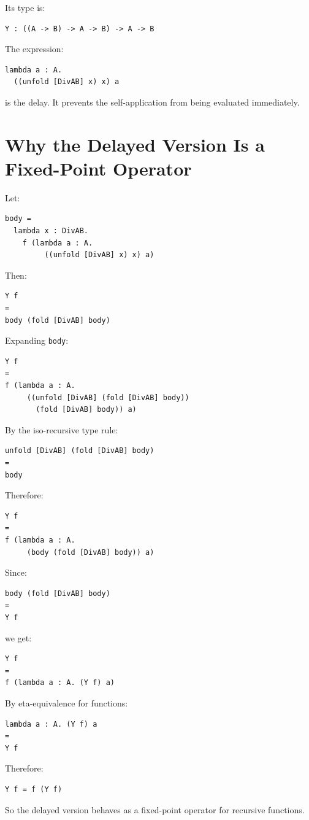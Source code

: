 \documentclass[manuscript]{acmart}
\begin{document}
Its type is:

\begin{lstlisting}
Y : ((A -> B) -> A -> B) -> A -> B
\end{lstlisting}

The expression:

\begin{lstlisting}
lambda a : A.
  ((unfold [DivAB] x) x) a
\end{lstlisting}

is the delay. It prevents the self-application from being evaluated immediately.

\section{Why the Delayed Version Is a Fixed-Point Operator}

Let:

\begin{lstlisting}
body =
  lambda x : DivAB.
    f (lambda a : A.
         ((unfold [DivAB] x) x) a)
\end{lstlisting}

Then:

\begin{lstlisting}
Y f
=
body (fold [DivAB] body)
\end{lstlisting}

Expanding \texttt{body}:

\begin{lstlisting}
Y f
=
f (lambda a : A.
     ((unfold [DivAB] (fold [DivAB] body))
       (fold [DivAB] body)) a)
\end{lstlisting}

By the iso-recursive type rule:

\begin{lstlisting}
unfold [DivAB] (fold [DivAB] body)
=
body
\end{lstlisting}

Therefore:

\begin{lstlisting}
Y f
=
f (lambda a : A.
     (body (fold [DivAB] body)) a)
\end{lstlisting}

Since:

\begin{lstlisting}
body (fold [DivAB] body)
=
Y f
\end{lstlisting}

we get:

\begin{lstlisting}
Y f
=
f (lambda a : A. (Y f) a)
\end{lstlisting}

By eta-equivalence for functions:

\begin{lstlisting}
lambda a : A. (Y f) a
=
Y f
\end{lstlisting}

Therefore:

\begin{lstlisting}
Y f = f (Y f)
\end{lstlisting}

So the delayed version behaves as a fixed-point operator for recursive functions.
\end{document}
